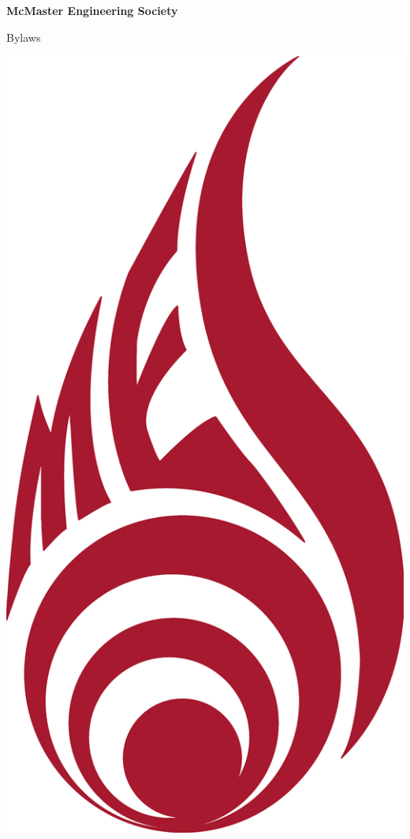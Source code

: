 \begin{titlepage}
\begin{center}

{\Huge \textbf{McMaster Engineering Society}}
\newline

{\Huge Bylaws}

\vfill
\includegraphics[width=0.5\linewidth]{Logo_MES_Red}
\vfill
{}

\end{center}
\end{titlepage}
